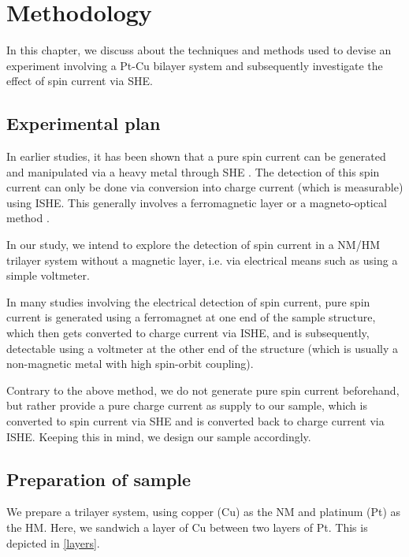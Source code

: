 \chapter{Methodology}

\label{chapter4}

In this chapter, we discuss about the techniques and methods used to devise an experiment involving a Pt-Cu bilayer system and subsequently investigate the effect of spin current via SHE.

\section{Experimental plan} \label{sec:plan}

In earlier studies, it has been shown that a pure spin current can be generated and manipulated via a heavy metal through SHE \cite{hirsch1999spin,sinova2004universal,zhang2000spin}. The detection of this spin current can only be done via conversion into charge current (which is measurable) using ISHE. This generally involves a ferromagnetic layer or a magneto-optical method \cite{kimura2007room,li2019spin,stamm2017magneto,valenzuela2007electrical}.

In our study, we intend to explore the detection of spin current in a NM/HM trilayer system without a magnetic layer, i.e. via electrical means such as using a simple voltmeter.

In many studies involving the electrical detection of spin current, pure spin current is generated using a ferromagnet at one end of the sample structure, which then gets converted to charge current via ISHE, and is subsequently, detectable using a voltmeter at the other end of the structure (which is usually a non-magnetic metal with high spin-orbit coupling).

Contrary to the above method, we do not generate pure spin current beforehand, but rather provide a pure charge current as supply to our sample, which is converted to spin current via SHE and is converted back to charge current via ISHE. Keeping this in mind, we design our sample accordingly.

\section{Preparation of sample}

We prepare a trilayer system, using copper (Cu) as the NM and platinum (Pt) as the HM. Here, we sandwich a layer of Cu between two layers of Pt. This is depicted in \cref{layers}.

